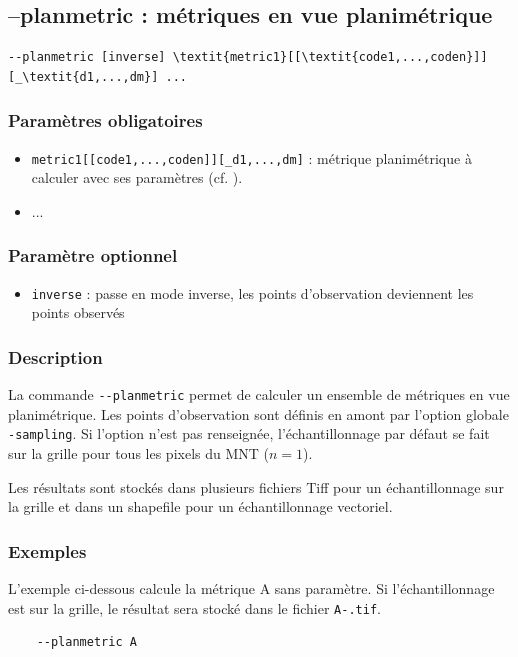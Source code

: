 \documentclass{report}
\begin{document}
\subsection{--planmetric : métriques en vue planimétrique}

\begin{Verbatim}[commandchars=\\\{\}]
--planmetric [inverse] \textit{metric1}[[\textit{code1,...,coden}]][_\textit{d1,...,dm}] ...
\end{Verbatim}

\subsubsection{Paramètres obligatoires}
\begin{itemize}
	\item \verb|metric1[[code1,...,coden]][_d1,...,dm]| : métrique planimétrique à calculer avec ses paramètres (cf. ).
	\item ...
\end{itemize}

\subsubsection{Paramètre optionnel}
\begin{itemize}
	\item \verb|inverse| : passe en mode inverse, les points d'observation deviennent les points observés
\end{itemize}

\subsubsection{Description}
La commande \verb|--planmetric| permet de calculer un ensemble de métriques en vue planimétrique. Les points d'observation sont définis en amont par l'option globale \verb|-sampling|. Si l'option n'est pas renseignée, l'échantillonnage par défaut se fait sur la grille pour tous les pixels du MNT ($n=1$).

Les résultats sont stockés dans plusieurs fichiers Tiff pour un échantillonnage sur la grille et dans un shapefile pour un échantillonnage vectoriel.


\subsubsection{Exemples}

L'exemple ci-dessous calcule la métrique A sans paramètre. Si l'échantillonnage est sur la grille, le résultat sera stocké dans le fichier \verb|A-.tif|.
\begin{Verbatim}
	--planmetric A
\end{Verbatim}
\end{document}
